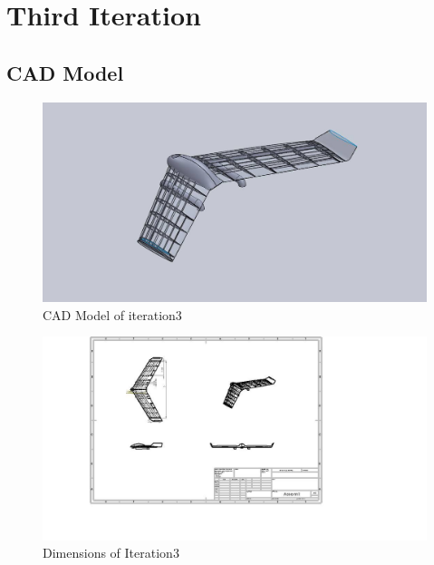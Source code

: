 \chapter{Third Iteration}
\section{CAD Model}
\begin{figure}[H]
\centering
\includegraphics[width = \textwidth]{iter3-2.png}
\caption{CAD Model of iteration3}
\end{figure}
\begin{figure}[H]
 \centering
 \includegraphics[width = 1.4\textwidth]{iter3.png}
 \caption{Dimensions of Iteration3}
\end{figure}
\newpage
